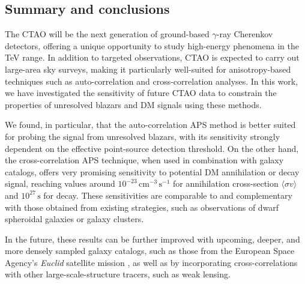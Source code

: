 \subsection{Summary and conclusions}\label{sec:xcorr:conclusions}

The CTAO will be the next generation of ground-based $\gamma$-ray Cherenkov detectors, offering a unique opportunity to study high-energy phenomena in the TeV range.  In addition to targeted observations, CTAO is expected to carry out large-area sky surveys, making it particularly well-suited for anisotropy-based techniques such as auto-correlation and cross-correlation analyses.
In this work, we have investigated the sensitivity of future CTAO data to constrain the properties of unresolved blazars and DM signals using these methods.

We found, in particular, that the auto-correlation APS method is better suited for probing the signal from unresolved blazars, with its sensitivity strongly dependent on the effective {point-}source detection threshold. On the other hand, the cross-correlation APS technique, when used in combination with galaxy catalogs, offers very promising sensitivity to potential DM annihilation or decay signal, reaching values around $10^{-23}\,\mathrm{cm^{-3}\,s^{-1}}$ for annihilation cross-section $\langle \sigma v \rangle$ and $10^{27}\,\mathrm{s}$ for decay.
These sensitivities are comparable to and complementary with those obtained from existing strategies, such as observations of dwarf spheroidal galaxies or galaxy clusters.


In the future, these results can be further improved with upcoming, deeper, and more densely sampled galaxy catalogs, such as those from the European Space Agency's \textit{Euclid} satellite mission \cite{2024arXiv240513491E}, as well as by incorporating cross-correlations with other large-scale-structure tracers, such as weak lensing.


